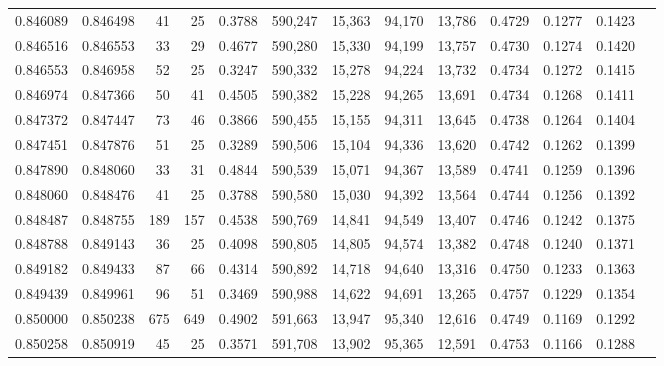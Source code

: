 \begin{tabular}{rrrrrrrrrrrrr}
0.846089 & 0.846498 &    41 &  25 &                                     0.3788 & 590,247 &  15,363 &  94,170 &  13,786 & 0.4729 & 0.1277 & 0.1423 \\
0.846516 & 0.846553 &    33 &  29 &                                     0.4677 & 590,280 &  15,330 &  94,199 &  13,757 & 0.4730 & 0.1274 & 0.1420 \\
0.846553 & 0.846958 &    52 &  25 &                                     0.3247 & 590,332 &  15,278 &  94,224 &  13,732 & 0.4734 & 0.1272 & 0.1415 \\
0.846974 & 0.847366 &    50 &  41 &                                     0.4505 & 590,382 &  15,228 &  94,265 &  13,691 & 0.4734 & 0.1268 & 0.1411 \\
0.847372 & 0.847447 &    73 &  46 &                                     0.3866 & 590,455 &  15,155 &  94,311 &  13,645 & 0.4738 & 0.1264 & 0.1404 \\
0.847451 & 0.847876 &    51 &  25 &                                     0.3289 & 590,506 &  15,104 &  94,336 &  13,620 & 0.4742 & 0.1262 & 0.1399 \\
0.847890 & 0.848060 &    33 &  31 &                                     0.4844 & 590,539 &  15,071 &  94,367 &  13,589 & 0.4741 & 0.1259 & 0.1396 \\
0.848060 & 0.848476 &    41 &  25 &                                     0.3788 & 590,580 &  15,030 &  94,392 &  13,564 & 0.4744 & 0.1256 & 0.1392 \\
0.848487 & 0.848755 &   189 & 157 &                                     0.4538 & 590,769 &  14,841 &  94,549 &  13,407 & 0.4746 & 0.1242 & 0.1375 \\
0.848788 & 0.849143 &    36 &  25 &                                     0.4098 & 590,805 &  14,805 &  94,574 &  13,382 & 0.4748 & 0.1240 & 0.1371 \\
0.849182 & 0.849433 &    87 &  66 &                                     0.4314 & 590,892 &  14,718 &  94,640 &  13,316 & 0.4750 & 0.1233 & 0.1363 \\
0.849439 & 0.849961 &    96 &  51 &                                     0.3469 & 590,988 &  14,622 &  94,691 &  13,265 & 0.4757 & 0.1229 & 0.1354 \\
0.850000 & 0.850238 &   675 & 649 &                                     0.4902 & 591,663 &  13,947 &  95,340 &  12,616 & 0.4749 & 0.1169 & 0.1292 \\
0.850258 & 0.850919 &    45 &  25 &                                     0.3571 & 591,708 &  13,902 &  95,365 &  12,591 & 0.4753 & 0.1166 & 0.1288 \\

\end{tabular}
